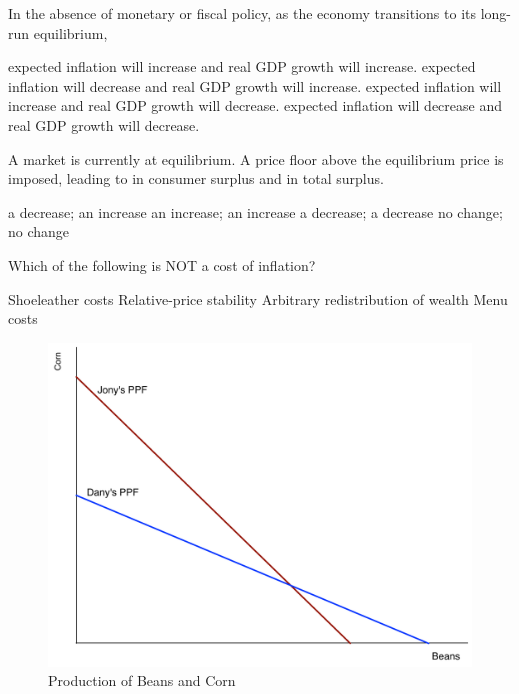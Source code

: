 \documentclass[addpoints,11pt]{exam}
\theoremstyle{definition}
\newcommand{\blank}[0]{\underline{\hspace{3cm}}}
\begin{document}
\begin{questions}
	\question \label{q15} In the absence of monetary or fiscal policy, as the economy transitions to its long-run equilibrium,
	
	\begin{choices}
		\choice expected inflation will increase and real GDP growth will increase.
		\choice expected inflation will decrease and real GDP growth will increase.
		\CorrectChoice expected inflation will increase and real GDP growth will decrease.
		\choice expected inflation will decrease and real GDP growth will decrease.
	\end{choices}
	
	\question A market is currently at equilibrium. A price floor above the equilibrium price is imposed, leading to \blank in consumer surplus and \blank in total surplus.
	
	\begin{choices}
		\choice a decrease; an increase
		\choice an increase; an increase
		\CorrectChoice a decrease; a decrease
		\choice no change; no change
	\end{choices}

	
	\question Which of the following is NOT a cost of inflation?
	
	\begin{choices}
		\choice Shoeleather costs
		\CorrectChoice Relative-price stability
		\choice Arbitrary redistribution of wealth
		\choice Menu costs
	\end{choices}
	




\begin{figure}[H]
	\centering
	\includegraphics[scale=.4]{Final_MC18.pdf}
	\caption{Production of Beans and Corn}
	\label{MC18}
\end{figure}


\end{questions}
\end{document}
